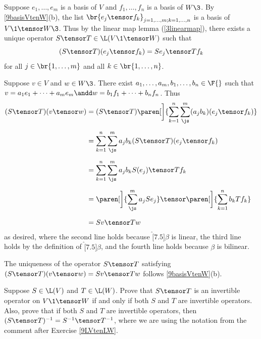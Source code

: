 \begin{Solution}
Suppose $e_1, \ldots, e_m$ is a basis of $V$ and $f_1, \ldots, f_n$ is a basis of $W\3$. By \ref{9basisVtenW}(b),
the list
$\br{e_j \tensor f_k}_{j = 1, \ldots, m; k = 1, \ldots, n}$ is a basis of $V\1 \tensor W\3$. Thus by the linear map lemma (\ref{3linearmap}), there exists a unique operator $S \tensor T \in \L(V\1 \tensor W)$ such that
\[
(S \tensor T)(e_j \tensor f_k) = Se_j \tensor T f_k
\]
for all $j \in \br{1, \ldots, m}$ and all $k \in \br{1, \ldots, n}$.

Suppose $v \in V$ and $w \in W\3$. There exist $a_1, \ldots, a_m, b_1, \ldots, b_n \in \F{}$ such that
$
v = a_1 e_1 + \cdots + a_m e_m \andd w = b_1 f_1 + \cdots + b_n f_n$.
Thus
\begin{align*}
(S \tensor T)(v \tensor w) &= (S \tensor T) \paren[\bigg]{ \sum_{k=1}^n \sum_{\js}^m  (a_j b_k) (e_j \tensor f_k) } \\[6bp]
&= \sum_{k=1}^n \sum_{\js}^m a_j b_k (S \tensor T)(e_j \tensor f_k) \\[6bp]
&= \sum_{k=1}^n \sum_{\js}^m a_j b_k S(e_j) \tensor Tf_k \\[6bp]
&= \paren[\bigg]{ \sum_{\js}^m a_j Se_j } \tensor \paren[\bigg]{ \sum_{k=1}^n b_k Tf_k } \\[6bp]
&= Sv \tensor Tw
\end{align*}
as desired, where the second line holds because $\hat[7.5]{\beta}$ is linear, the third line holds by the definition of $\hat[7.5]{\beta}$, and the fourth line holds because $\beta$ is bilinear.

The uniqueness of the operator $S \tensor T$ satisfying $(S \tensor T)(v \tensor w) = Sv \tensor Tw$ follows \ref{9basisVtenW}(b).
\end{Solution}

\exercise
Suppose $S \in \L(V)$ and $T \in \L(W)$. Prove that $S \tensor T$ is an invertible operator on $V\1 \tensor W$ if and only if both $S$ and $T$ are invertible operators. Also, prove that  if both $S$ and $T$ are invertible operators, then
$(S \tensor T)^{-1} = S^{-1} \tensor T^{-1}$, where we are using the notation from the comment after Exercise \ref{9LVtenLW}.

